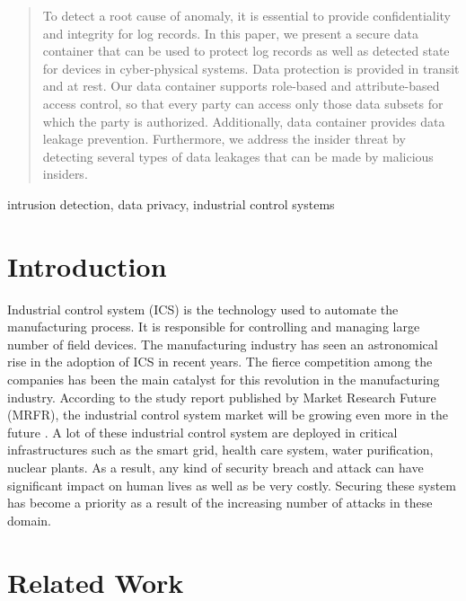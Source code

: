 \documentclass[conference]{IEEEtran}
\begin{document}
\begin{abstract}
To detect a root cause of anomaly, it is essential to provide confidentiality and integrity for log records. In this paper, we present a secure data container that can be used to protect log records as well as detected state for devices in cyber-physical systems. Data protection is provided in transit and at rest. Our data container supports role-based and attribute-based access control, so that every party can access only those data subsets for which the party is authorized. Additionally, data container provides data leakage prevention. Furthermore, we address the insider threat by detecting several types of data leakages that can be made by malicious insiders. 
\end{abstract}

\begin{IEEEkeywords}
intrusion detection, data privacy, industrial control systems 
\end{IEEEkeywords}

\section{Introduction}
Industrial control system (ICS) is the technology used to automate the manufacturing process. It is responsible for controlling and managing large number of field devices. The manufacturing industry has seen an astronomical rise in the adoption of ICS in recent years. The fierce competition among the companies has been the main catalyst for this revolution in the manufacturing industry. According to the study report published by  Market Research Future (MRFR), the industrial control system market will be growing even more in the future \cite{c1}. A lot of these industrial control system are deployed in critical infrastructures such as the smart grid, health care system, water purification, nuclear plants. As a result, any kind of security breach and attack can have significant impact on human lives as well as be very costly. Securing these system has become a priority as a result of the increasing number of attacks in these domain. 
\section{Related Work}
\end{document}
